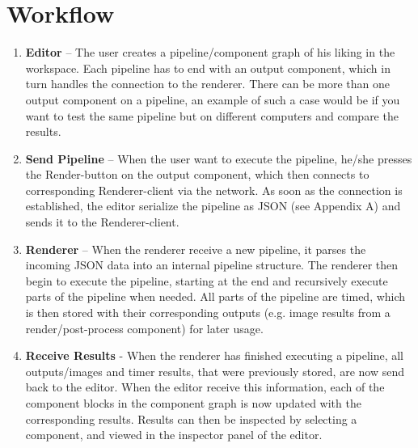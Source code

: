 \section{Workflow}


\begin{enumerate}
  \item \textbf{Editor} -- The user creates a pipeline/component graph of his liking in the workspace. Each pipeline has to end with an output component, which in turn handles the connection to the renderer. There can be more than one output component on a pipeline, an example of such a case would be if you want to test the same pipeline but on different computers and compare the results.
  \item \textbf{Send Pipeline} -- When the user want to execute the pipeline, he/she presses the Render-button on the output component, which then connects to corresponding Renderer-client via the network. As soon as the connection is established, the editor serialize the pipeline as JSON (see Appendix A) and sends it to the Renderer-client.
  \item \textbf{Renderer} -- When the renderer receive a new pipeline, it parses the incoming JSON data into an internal pipeline structure. The renderer then begin to execute the pipeline, starting at the end and recursively execute parts of the pipeline when needed. All parts of the pipeline are timed, which is then stored with their corresponding outputs (e.g. image results from a render/post-process component) for later usage.
  \item \textbf{Receive Results} - When the renderer has finished executing a pipeline, all outputs/images and timer results, that were previously stored, are now send back to the editor. When the editor receive this information, each of the component blocks in the component graph is now updated with the corresponding results. Results can then be inspected by selecting a component, and viewed in the inspector panel of the editor.
\end{enumerate}
